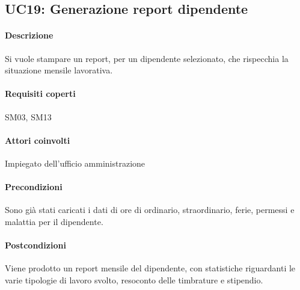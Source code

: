 \subsection{UC19: Generazione report dipendente}
\paragraph{Descrizione}
Si vuole stampare un report, per un dipendente selezionato, che rispecchia la situazione mensile lavorativa.
\paragraph{Requisiti coperti}
SM03, SM13
\paragraph{Attori coinvolti}
Impiegato dell'ufficio amministrazione
\paragraph{Precondizioni}
Sono già stati caricati i dati di ore di ordinario, straordinario, ferie, permessi e malattia per il dipendente.
\paragraph{Postcondizioni}
Viene prodotto un report mensile del dipendente, con statistiche riguardanti le varie tipologie di lavoro svolto, resoconto delle timbrature e stipendio.
